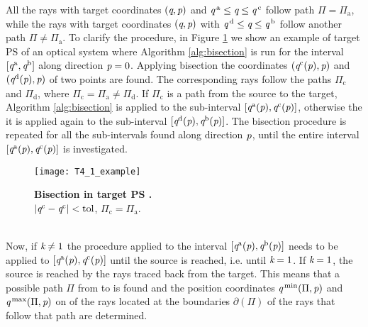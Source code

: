 All the rays with target coordinates $(\textit{q}, \textit{p})$ and $\textit{q}^{\,\textrm{a}}\leq\textit{q}\leq\textit{q}^{\,\textrm{c}}$ follow path $\Pi = \Pi_{\textrm{a}}$, while the rays with target coordinates $(\textit{q}, \textit{p})$ with $\textit{q}^{\,\textrm{d}}\leq\textit{q}\leq\textit{q}^{\,\textrm{b}}$ follow another path $\Pi \neq \Pi_{\textrm{a}}.$ 
To clarify the procedure, in Figure \ref{fig:bisec} we show an example of target PS of an optical system where Algorithm \ref{alg:bisection} is run for the interval $[\textit{q}^{\textrm{a}}, \textit{q}^{\textrm{b}}]$ along direction $\textit{p}=0$. Applying bisection the coordinates $(\textit{q}^{\textrm{c}}(\textit{p}), \textit{p})$ and $(\textit{q}^{\textrm{d}}(\textit{p}), \textit{p})$ of two points are found. The corresponding rays follow the paths $\Pi_{\textrm{c}}$ and $\Pi_{\textrm{d}}$, where $\Pi_{\textrm{c}}= \Pi_{\textrm{a}}\neq\Pi_{\textrm{d}}$. If $\Pi_{\textrm{c}}$ is a path from the source to the target, Algorithm \ref{alg:bisection} is applied to the sub-interval 
$[\textit{q}^{\textrm{a}}(\textit{p}), \textit{q}^{\textrm{c}}(\textit{p})]$, otherwise the it is applied again to the sub-interval $[\textit{q}^{\textrm{d}}(\textit{p}), \textit{q}^{\textrm{b}}(\textit{p})]$. The bisection procedure is repeated for all the sub-intervals found along direction $\textit{p}$, until the entire interval $[\textit{q}^{\textrm{a}}(\textit{p}), \textit{q}^{\textrm{c}}(\textit{p})]$ is investigated.
\begin{figure}[h]
  \begin{center}
  \texttt{[image: T4\_1\_example]}
  \end{center}
  \caption{\textbf{Bisection in target PS .}\\
$|\textit{q}^{\textrm{c}}-\textit{q}^{\textrm{c}}|<\textrm{tol}$, $\Pi_{\textrm{c}}= \Pi_{\textrm{a}}$.}
\label{fig:bisec}
 \end{figure}
\\ \indent Now, if $\textit{k}\neq1$ the procedure applied to the interval 
$[\textit{q}^{\textrm{a}}(\textit{p}), \textit{q}^{\textrm{b}}(\textit{p})]$ needs to be applied to $[\textit{q}^{\textrm{a}}(\textit{p}),\textit{q}^{\textrm{c}}(\textit{p})]$ until the source is reached, i.e. until $\textit{k}=1$. If $\textit{k}=1$, the source is reached by the rays traced back from the target. This means that a possible path $\Pi$ from  to  is found and the position coordinates $\textit{q}^{\textrm{\,min}}(\Pi, \textit{p})$ and $\textit{q}^{\textrm{\,max}}(\Pi, \textit{p})$ on  of the rays located at the boundaries $\partial$$(\Pi)$ of the rays that follow that path are determined. \\ \indent 
